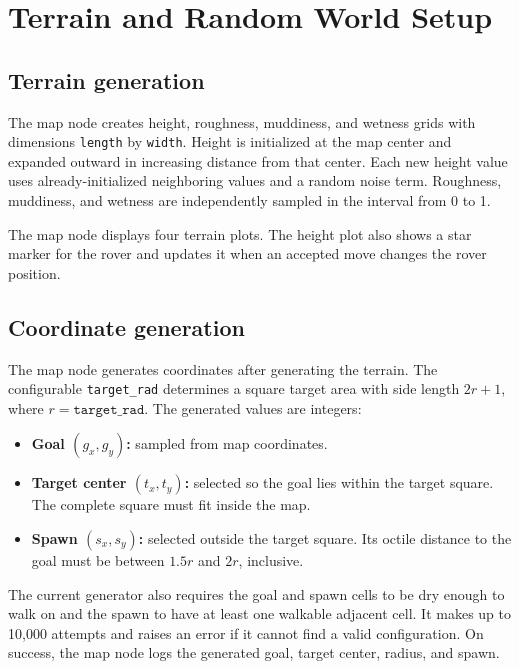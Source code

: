 \documentclass[11pt,a4paper]{article}
\begin{document}
\section{Terrain and Random World Setup}

\subsection{Terrain generation}

The map node creates height, roughness, muddiness, and wetness grids with
dimensions \texttt{length} by \texttt{width}. Height is initialized at the map
center and expanded outward in increasing distance from that center. Each new
height value uses already-initialized neighboring values and a random noise
term. Roughness, muddiness, and wetness are independently sampled in the
interval from 0 to 1.

The map node displays four terrain plots. The height plot also shows a star
marker for the rover and updates it when an accepted move changes the rover
position.

\subsection{Coordinate generation}

The map node generates coordinates after generating the terrain. The
configurable \texttt{target\_rad} determines a square target area with side
length \(2r+1\), where \(r=\texttt{target\_rad}\). The generated values are
integers:
\begin{itemize}
    \item \textbf{Goal \((g_x,g_y)\):} sampled from map coordinates.
    \item \textbf{Target center \((t_x,t_y)\):} selected so the goal lies
    within the target square. The complete square must fit inside the map.
    \item \textbf{Spawn \((s_x,s_y)\):} selected outside the target square.
    Its octile distance to the goal must be between \(1.5r\) and \(2r\),
    inclusive.
\end{itemize}

The current generator also requires the goal and spawn cells to be dry enough
to walk on and the spawn to have at least one walkable adjacent cell. It makes
up to 10,000 attempts and raises an error if it cannot find a valid
configuration. On success, the map node logs the generated goal, target
center, radius, and spawn.
\end{document}
